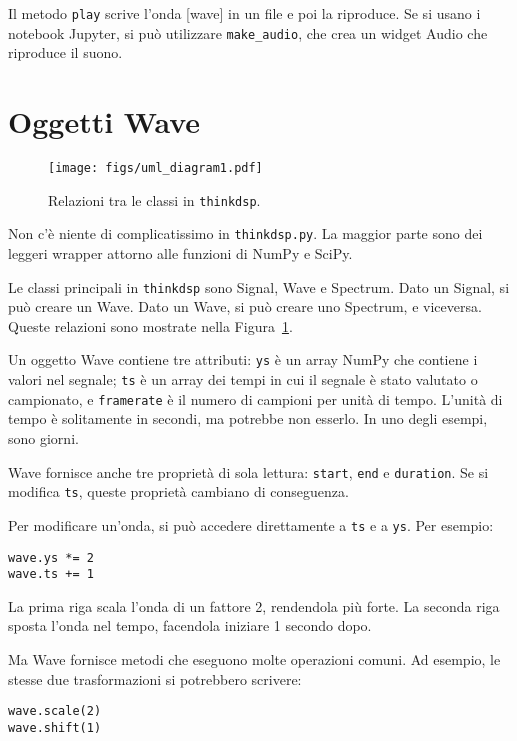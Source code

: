 \documentclass[12pt]{book} \usepackage[width=5.5in,height=8.5in, hmarginratio=3:2,vmarginratio=1:1]{geometry}
\begin{document}
Il metodo {\tt play} scrive l'onda [wave] in un file e poi la riproduce. Se si usano i notebook Jupyter, si può utilizzare \verb"make_audio", che crea un widget Audio che riproduce il suono.

\section{Oggetti Wave} 

\begin{figure} 

\centerline{\texttt{[image: figs/uml\_diagram1.pdf]}} \caption{Relazioni tra le classi in {\tt thinkdsp}.} \label{fig.diagram1} \end{figure} 

Non c'è niente di complicatissimo in {\tt thinkdsp.py}. La maggior parte sono dei leggeri wrapper attorno alle funzioni di NumPy e SciPy.

Le classi principali in {\tt thinkdsp} sono Signal, Wave e Spectrum. Dato un Signal, si può creare un Wave. Dato un Wave, si può creare uno Spectrum, e viceversa. Queste relazioni sono mostrate nella Figura~\ref{fig.diagram1}.

Un oggetto Wave contiene tre attributi: {\tt ys} è un array NumPy che contiene i valori nel segnale; {\tt ts} è un array dei tempi in cui il segnale è stato valutato o campionato, e {\tt framerate} è il numero di campioni per unità di tempo. L'unità di tempo è solitamente in secondi, ma potrebbe non esserlo. In uno degli esempi, sono giorni.

Wave fornisce anche tre proprietà di sola lettura: {\tt start}, {\tt end} e {\tt duration}. Se si modifica {\tt ts}, queste proprietà cambiano di conseguenza.

Per modificare un'onda, si può accedere direttamente a {\tt ts} e a {\tt ys}. Per esempio:

\begin{verbatim} 
wave.ys *= 2
wave.ts += 1
 \end{verbatim} 

La prima riga scala l'onda di un fattore 2, rendendola più forte. La seconda riga sposta l'onda nel tempo, facendola iniziare 1 secondo dopo.

Ma Wave fornisce metodi che eseguono molte operazioni comuni. Ad esempio, le stesse due trasformazioni si potrebbero scrivere:

\begin{verbatim} 
wave.scale(2)
wave.shift(1)
 \end{verbatim} 
\end{document}
